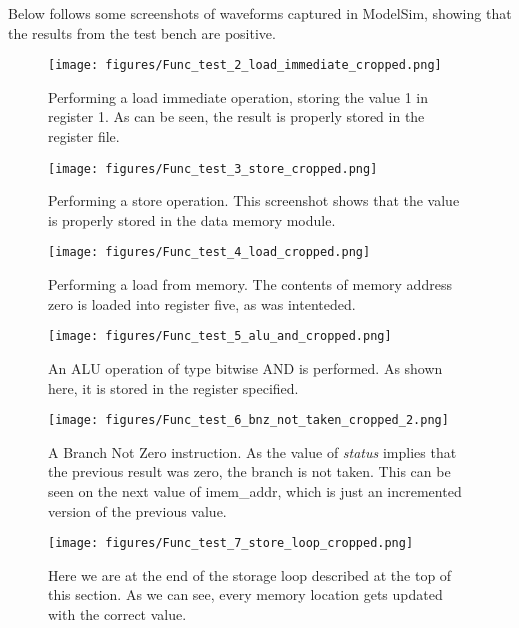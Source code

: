 \documentclass[11pt]{article}
\begin{document}
Below follows some screenshots of waveforms captured in ModelSim,
showing that the results from the test bench are positive.
\newpage{}
\begin{figure}[pht]
  \centering
  \texttt{[image: figures/Func\_test\_2\_load\_immediate\_cropped.png]}
  \caption{\label{fig:ldi} Performing a load immediate operation,
    storing the value 1 in register 1. As can be seen, the result is
    properly stored in the register file.}
\end{figure}

\begin{figure}[pht]
  \centering
  \texttt{[image: figures/Func\_test\_3\_store\_cropped.png]}
  \caption{\label{fig:store} Performing a store operation. This
    screenshot shows that the value is properly stored in the data
    memory module.}
\end{figure}

\begin{figure}[pht]
  \centering
  \texttt{[image: figures/Func\_test\_4\_load\_cropped.png]}
  \caption{\label{fig:load} Performing a load from memory. The contents
    of memory address zero is loaded into register five, as was
    intenteded.}
\end{figure}

\begin{figure}[pht]
  \centering
  \texttt{[image: figures/Func\_test\_5\_alu\_and\_cropped.png]}
  \caption{\label{fig:aluAnd} An ALU operation of type bitwise AND is
    performed. As shown here, it is stored in the register specified.}
\end{figure}

\begin{figure}[pht]
  \centering
  \texttt{[image: figures/Func\_test\_6\_bnz\_not\_taken\_cropped\_2.png]}
  \caption{\label{fig:bnz} A Branch Not Zero instruction. As the value
    of {\em status} implies that the previous result was zero, the
    branch is not taken. This can be seen on the next value of
    imem\_addr, which is just an incremented version of the previous
    value.}
\end{figure}

\begin{figure}[pht]
  \centering
  \texttt{[image: figures/Func\_test\_7\_store\_loop\_cropped.png]}
  \caption{\label{fig:storeloop} Here we are at the end of the storage loop
    described at the top of this section. As we can see, every memory
    location gets updated with the correct value.}
\end{figure}
\end{document}
